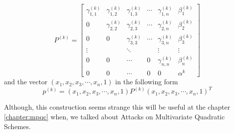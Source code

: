 \begin{equation}
 P^{(k)}=\left[\begin{matrix}
   \gamma_{1,1}^{(k)} & \gamma_{1,2}^{(k)} & \gamma_{1,3}^{(k)} & \cdots & \gamma_{1,n}^{(k)} & \beta_{1}^{(k)}\\
  0 & \gamma_{2,2}^{(k)} & \gamma_{2,3}^{(k)} & \cdots & \gamma_{2,n}^{(k)} & \beta_{2}^{(k)}\\
  0 & 0 & \gamma_{3,3}^{(k)} & \cdots & \gamma_{3,n}^{(k)} & \beta_{3}^{(k)}\\
  \vdots &  & \ddots &  & \vdots & \vdots\\  
  0 & 0 & \cdots & 0 & \gamma_{n,n}^{(k)} & \beta_{n}^{(k)}\\
   0 & 0 & \cdots & 0 & 0 & \alpha^{k} 
   \end{matrix}\right]
\label{eq:3}
\end{equation}
and the vector $(x_1,x_2,x_3,\cdots,x_n,1)$ in the following form
\begin{equation}
p^{(k)} = (x_1,x_2,x_3,\cdots,x_n,1) P^{(k)} (x_1,x_2,x_3,\cdots,x_n,1)^{T}
\end{equation}

Although, this construction seems strange this will be useful at the chapter \ref{chapter:mpqc} when, we talked about Attacks on Multivariate Quadratic Schemes.

